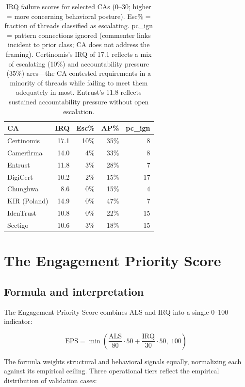 \documentclass[10pt,twocolumn,letterpaper]{article}
\begin{document}
\begin{table}[t]
\centering
\footnotesize
\setlength{\tabcolsep}{3pt}
\caption{IRQ failure scores for selected CAs (0--30; higher = more concerning
behavioral posture). Esc\% = fraction of threads classified as escalating.
pc\_ign = pattern connections ignored (commenter links incident to prior class;
CA does not address the framing). Certinomis's IRQ of 17.1 reflects a mix of escalating (10\%) and accountability
pressure (35\%) arcs---the CA contested requirements in a minority of threads while
failing to meet them adequately in most. Entrust's 11.8 reflects sustained
accountability pressure without open escalation.}
\label{tab:irq}
\begin{tabularx}{\columnwidth}{@{}Xrrrr@{}}
\toprule
CA & IRQ & Esc\% & AP\% & pc\_ign \\
\midrule
Certinomis   & 17.1 & 10\% & 35\% &  8 \\
Camerfirma   & 14.0 &  4\% & 33\% &  8 \\
Entrust      & 11.8 &  3\% & 28\% &  7 \\
\midrule
DigiCert     & 10.2 &  2\% & 15\% & 17 \\
Chunghwa     &  8.6 &  0\% & 15\% &  4 \\
KIR (Poland) & 14.9 &  0\% & 47\% &  7 \\
IdenTrust    & 10.8 &  0\% & 22\% & 15 \\
Sectigo      & 10.6 &  3\% & 18\% & 15 \\
\bottomrule
\end{tabularx}
\end{table}

\section{The Engagement Priority Score}
\label{sec:eps}

\subsection{Formula and interpretation}

The Engagement Priority Score combines ALS and IRQ into a single 0--100 indicator:

\[
\text{EPS} = \min\!\left(\frac{\text{ALS}}{80}\cdot 50 + \frac{\text{IRQ}}{30}\cdot 50,\; 100\right)
\]

The formula weights structural and behavioral signals equally, normalizing each against
its empirical ceiling. Three operational tiers reflect the empirical distribution of
validation cases:
\end{document}
